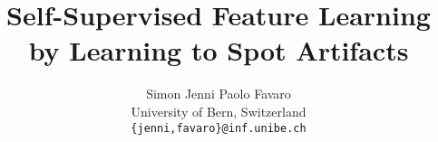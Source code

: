 \documentclass[10pt,twocolumn,letterpaper]{article}
\begin{document}
\title{Self-Supervised Feature Learning by Learning to Spot Artifacts}

\author{Simon Jenni \qquad Paolo Favaro\\
University of Bern, Switzerland\\
{\tt\small \{jenni,favaro\}@inf.unibe.ch}}



\maketitle
\end{document}
